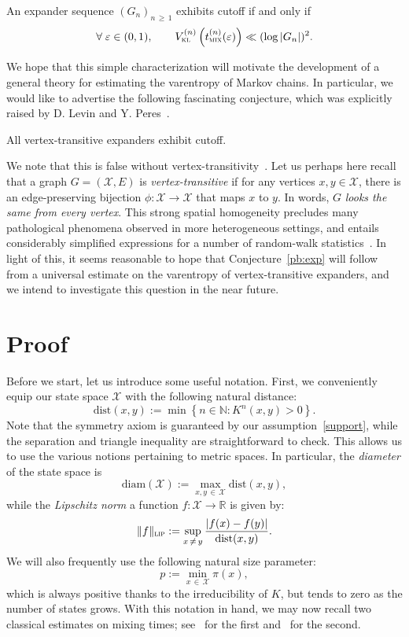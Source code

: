 \documentclass[AHL,Unicode,longabstracts,published]{cedram}
\newcommand{\N}{\mathbb{N}}
\newcommand{\R}{\mathbb{R}}
\newcommand{\cX}{\mathcal{X}}
\newcommand{\dist}{\mathrm{dist}}
\newcommand{\vkl}{V_{\textsc{kl}}}
\newcommand{\tmix}{t_{\textsc{mix}}}
\newcommand{\diam}{\mathrm{diam}}
\newcommand{\lip}{{\textsc{lip}}}
\let\oldforall\forall
\renewcommand*{\forall}{\mathrel{\oldforall}}
\begin{document}
\begin{coro}[Expanders]
An expander sequence $(G_n)_{n\,\ge\,1}$ exhibits cutoff if and only if
\[
\forall\varepsilon\in(0,1),\qquad \vkl^{(n)}\left(\tmix^{(n)}(\varepsilon)\right) \ll (\log |G_n|)^2.
\]
\end{coro}

We hope that this simple characterization will motivate the development of a general theory for estimating the varentropy of Markov chains. In particular, we would like to advertise the following fascinating conjecture, which was explicitly raised by D. Levin and Y. Peres~\cite[Question~5]{MR3726904}.


\begin{conj}\label{pb:exp}
All vertex-transitive expanders exhibit cutoff.
\end{conj}

We note that this is false without vertex-transitivity~\cite{MR2774096}. Let us perhaps here recall that a graph $G=(\cX,E)$ is \emph{vertex-transitive} if for any vertices $x,y\in \cX$, there is an edge-preserving bijection $\phi\colon \cX\to \cX$ that maps $x$ to $y$. In words, $G$ \emph{looks the same from every vertex}. This strong spatial homogeneity precludes many pathological phenomena observed in more heterogeneous settings, and entails considerably simplified expressions for a number of random-walk statistics~\cite{MR994089,arxiv.2001.01467,MR4253426}. In light of this, it seems reasonable to hope that Conjecture~\ref{pb:exp} will follow from a universal estimate on the varentropy of vertex-transitive expanders, and we intend to investigate this question in the near future.



\section{Proof}

Before we start, let us introduce some useful notation. First, we conveniently equip our state space $\cX$ with the following natural distance:
\[
\dist(x,y) := \min\left\{n\in\N\colon K^n(x,y)>0\right\}.
\]
Note that the symmetry axiom is guaranteed by our assumption~\eqref{support}, while the separation and triangle inequality are straightforward to check. This allows us to use the various notions pertaining to metric spaces. In particular, the \emph{diameter} of the state space is
\[
\diam(\cX) := \max_{x,y\,\in\,\cX}\dist(x,y),
\]
while the \emph{Lipschitz norm} a function $f\colon\cX\to\R$ is given by:
\[
\|f\|_\lip := \sup_{x\,\ne\,y}\frac{|f(x)-f(y)|}{\dist(x,y)}.
\]
We will also frequently use the following natural size parameter:
\[
p := \min_{x\,\in\,\cX}\pi(x),
\]
which is always positive thanks to the irreducibility of $K$, but tends to zero as the number of states grows. With this notation in hand, we may now recall two classical estimates on mixing times; see~\cite[Lemma~11]{arxiv.2102.05597} for the first and~\cite[Corollary~2.6]{MR2341319} for the second.
\end{document}
